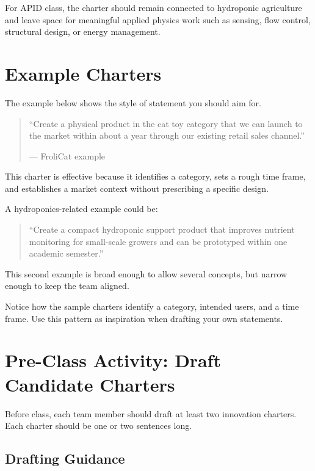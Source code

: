 For APID class, the charter should remain connected to hydroponic agriculture and leave space for meaningful applied physics work such as sensing, flow control, structural design, or energy management.

\section{Example Charters}

The example below shows the style of statement you should aim for.

\begin{quote}
``Create a physical product in the cat toy category that we can launch to the market within about a year through our existing retail sales channel.''

\hfill --- FroliCat example
\end{quote}

This charter is effective because it identifies a category, sets a rough time frame, and establishes a market context without prescribing a specific design.

A hydroponics-related example could be:

\begin{quote}
``Create a compact hydroponic support product that improves nutrient monitoring for small-scale growers and can be prototyped within one academic semester.''
\end{quote}

This second example is broad enough to allow several concepts, but narrow enough to keep the team aligned.

\begin{tcolorbox}[title=Hint]
Notice how the sample charters identify a category, intended users, and a time frame. Use this pattern as inspiration when drafting your own statements.
\end{tcolorbox}

\section{Pre-Class Activity: Draft Candidate Charters}

Before class, each team member should draft at least two innovation charters. Each charter should be one or two sentences long.

\subsection{Drafting Guidance}

